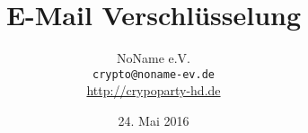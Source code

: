 \documentclass[mathserif]{beamer}
\title{E-Mail Verschlüsselung}
\author[NoName e.V.]{NoName e.V. \\ \small{\texttt{crypto@noname-ev.de} } \\ \small{\url{http://crypoparty-hd.de}} }
\date[24.05.16]{24. Mai 2016}
\begin{document}
\titlepage
\rmfamily %
\tocframe




\blackframe
\end{document}
